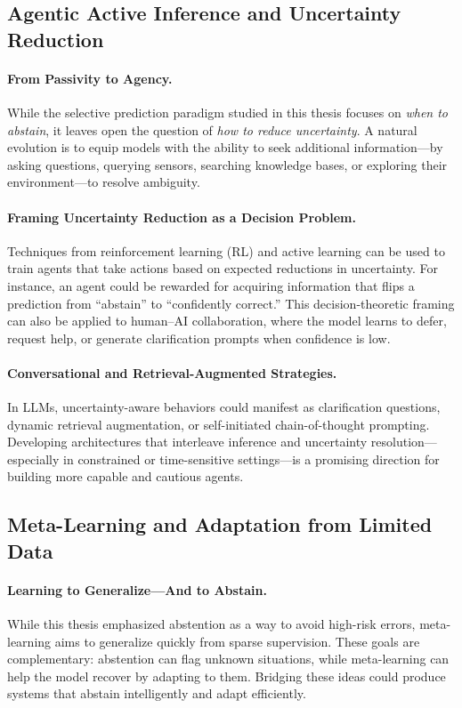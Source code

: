 \subsection{Agentic Active Inference and Uncertainty Reduction}

\paragraph{From Passivity to Agency.} While the selective prediction paradigm studied in this thesis focuses on \emph{when to abstain}, it leaves open the question of \emph{how to reduce uncertainty}. A natural evolution is to equip models with the ability to seek additional information—by asking questions, querying sensors, searching knowledge bases, or exploring their environment—to resolve ambiguity.

\paragraph{Framing Uncertainty Reduction as a Decision Problem.} Techniques from reinforcement learning (RL) and active learning can be used to train agents that take actions based on expected reductions in uncertainty. For instance, an agent could be rewarded for acquiring information that flips a prediction from “abstain” to “confidently correct.” This decision-theoretic framing can also be applied to human–AI collaboration, where the model learns to defer, request help, or generate clarification prompts when confidence is low.

\paragraph{Conversational and Retrieval-Augmented Strategies.} In LLMs, uncertainty-aware behaviors could manifest as clarification questions, dynamic retrieval augmentation, or self-initiated chain-of-thought prompting. Developing architectures that interleave inference and uncertainty resolution—especially in constrained or time-sensitive settings—is a promising direction for building more capable and cautious agents.

\subsection{Meta-Learning and Adaptation from Limited Data}

\paragraph{Learning to Generalize—And to Abstain.} While this thesis emphasized abstention as a way to avoid high-risk errors, meta-learning aims to generalize quickly from sparse supervision. These goals are complementary: abstention can flag unknown situations, while meta-learning can help the model recover by adapting to them. Bridging these ideas could produce systems that abstain intelligently and adapt efficiently.

